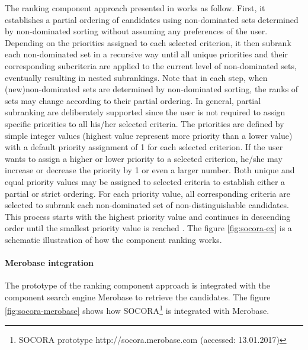 The ranking component approach presented in \cite{Kessel2016} works as follow. First, it establishes a partial ordering of candidates using non-dominated sets determined by non-dominated sorting without assuming any preferences of the user. Depending on the priorities assigned to each selected criterion, it then subrank each non-dominated set in a recursive way until all unique priorities and their corresponding subcriteria are applied to the current level of non-dominated sets, eventually resulting in nested subrankings. Note that in each step, when (new)non-dominated sets are determined by non-dominated sorting, the ranks of sets may change according to their partial ordering. In general, partial subranking are deliberately supported since the user is not required to assign specific priorities to all his/her selected criteria. The priorities are defined by simple integer values (highest value represent more priority than a lower value) with a default priority assignment of 1 for each selected criterion. If the user wants to assign a higher or lower priority to a selected criterion, he/she may increase or decrease the priority by 1 or even a larger number. Both unique and equal priority values may be assigned to selected criteria to establish either a partial or strict ordering. For each priority value, all corresponding criteria are selected to subrank each non-dominated set of non-distinguishable candidates. This process starts with the highest priority value and continues in descending order until the smallest priority value is reached \cite{Kessel2016}. The figure \ref{fig:socora-ex} is a schematic illustration of how the component ranking works.

\paragraph{Merobase integration}
The prototype of the ranking component approach is integrated with the component search engine Merobase to retrieve the candidates. The figure \ref{fig:socora-merobase} shows how SOCORA\footnote{SOCORA prototype http://socora.merobase.com (accessed: 13.01.2017)} is integrated with Merobase.

